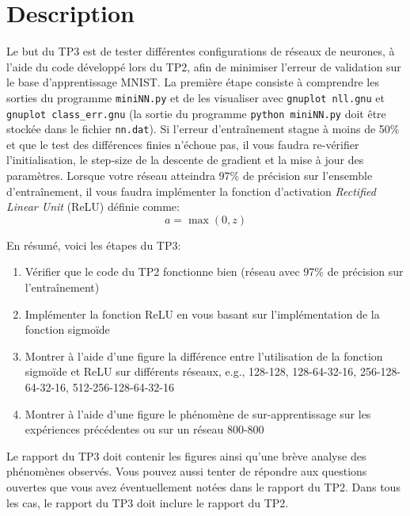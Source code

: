 \documentclass{article}
\begin{document}
\newpage 
\section{Description}
Le but du TP3 est de tester différentes configurations de réseaux de neurones, à l'aide du code développé lors du TP2, afin de minimiser l'erreur de validation sur le base d'apprentissage MNIST.
La première étape consiste à comprendre les sorties du programme \texttt{miniNN.py} et de les visualiser avec \texttt{gnuplot nll.gnu} et \texttt{gnuplot class\_err.gnu} (la sortie du programme \texttt{python miniNN.py} doit être stockée dans le fichier \texttt{nn.dat}).
Si l'erreur d'entraînement stagne à moins de 50\% et que le test des différences finies n'échoue pas, il vous faudra re-vérifier l'initialisation, le step-size de la descente de gradient et la mise à jour des paramètres.
Lorsque votre réseau atteindra 97\% de précision sur l'ensemble d'entraînement, il vous faudra implémenter la fonction d'activation {\it Rectified Linear Unit} (ReLU) définie comme:
\begin{equation}
a = \max(0,z)
\end{equation}

En résumé, voici les étapes du TP3:
\begin{enumerate}
\item Vérifier que le code du TP2 fonctionne bien (réseau avec 97\% de précision sur l'entraînement)
\item Implémenter la fonction ReLU en vous basant sur l'implémentation de la fonction sigmoïde 
\item Montrer à l'aide d'une figure la différence entre l'utilisation de la fonction sigmoïde et ReLU sur différents réseaux, e.g., 128-128, 128-64-32-16, 256-128-64-32-16, 512-256-128-64-32-16
\item Montrer à l'aide d'une figure le phénomène de sur-apprentissage sur les expériences précédentes ou sur un réseau 800-800
\end{enumerate}
Le rapport du TP3 doit contenir les figures ainsi qu'une brève analyse des phénomènes observés.
Vous pouvez aussi tenter de répondre aux questions ouvertes que vous avez éventuellement notées dans le rapport du TP2. 
Dans tous les cas, le rapport du TP3 doit inclure le rapport du TP2.
\end{document}
